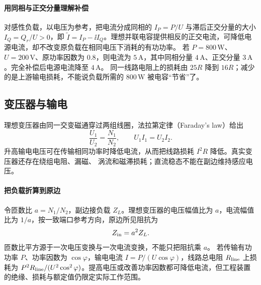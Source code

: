 \paragraph{用同相与正交分量理解补偿}
对感性负载，以电压为参考，把电流分成同相的 $I_P=P/U$ 与滞后正交分量的大小 $I_Q=Q_r/U>0$，即 $\widetilde I=I_P-\ii I_Q$。理想并联电容提供相反的正交电流，可降低电源电流，却不改变原负载在相同电压下消耗的有功功率。
若 $P=800\,\mathrm W$、$U=200\,\mathrm V$、原功率因数为 $0.8$，则电流为 $5\,\mathrm A$，其中同相分量 $4\,\mathrm A$、正交分量 $3\,\mathrm A$。完全补偿后电源电流降至 $4\,\mathrm A$。
同一线路电阻上的损耗由 $25R$ 降到 $16R$；减少的是上游输电损耗，不能说负载所需的 $800\,\mathrm W$ 被电容“节省”了。


\subsection{变压器与输电}


理想变压器由同一交变磁通穿过两组线圈，法拉第定律（Faraday's law）给出
\begin{equation}
 \frac{U_1}{U_2}=\frac{N_1}{N_2},
 \qquad U_1I_1=U_2I_2.
\end{equation}
升高输电电压可在传输相同功率时降低电流，从而把线路损耗 $I^2R$ 降低。真实变压器还存在绕组电阻、漏磁、
涡流和磁滞损耗；直流稳态不能在副边维持感应电压。


\paragraph{把负载折算到原边}
令匝数比 $a=N_1/N_2$，副边接负载 $Z_L$。理想变压器的电压幅值比为 $a$，电流幅值比为 $1/a$，按一致端口参考方向，原边所见阻抗为
\[
 Z_{\rm in}=a^2 Z_L.
\]
匝数比平方源于一次电压变换与一次电流变换，不能只把阻抗乘 $a$。
若传输有功功率 $P$、功率因数为 $\cos\varphi$，输电电流 $I=P/(U\cos\varphi)$，线路总电阻 $R_{\rm line}$ 上损耗为
$P^2R_{\rm line}/(U^2\cos^2\varphi)$。提高电压或改善功率因数都可降低电流，但工程装置的绝缘、损耗与额定值仍限定实际工作范围。

